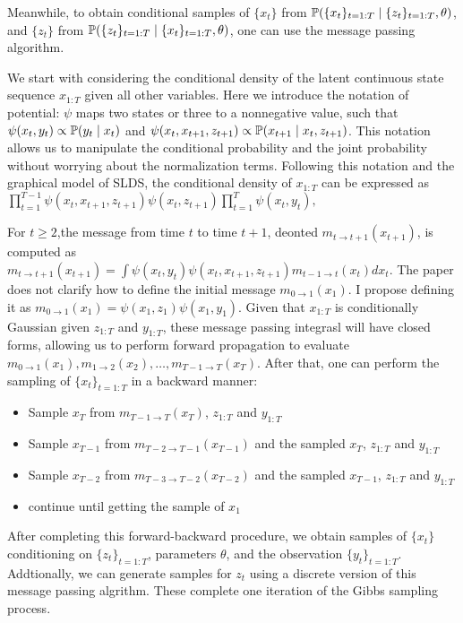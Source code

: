 Meanwhile, to obtain conditional samples of $\{x_t\}$ from $\mathbb{P}(\{x_{t}\}_{t=1:T} \mid \{z_t\}_{t=1:T}, \theta)$, and $\{z_t\}$ from $\mathbb{P}(\{z_{t}\}_{t=1:T} \mid \{x_t\}_{t=1:T}, \theta)$, one can use the message passing algorithm.

We start with considering the  conditional  density  of  the  latent continuous  state  sequence $x_{1:T}$ given  all  other  variables. Here we introduce the notation of potential: $\psi$ maps two states or three to a nonnegative value, such that $\psi(x_t,y_t)\propto \mathbb{P}(y_t \mid x_t)$ and $\psi(x_t,x_{t+1},z_{t+1})\propto \mathbb{P}(x_{t+1} \mid x_t,z_{t+1})$. This notation allows us to manipulate the conditional probability and the joint probability without worrying about the normalization terms. Following this notation and the graphical model of SLDS, the conditional density of $x_{1:T}$ can be expressed as $
\prod_{t=1}^{T-1} \psi\left(x_{t}, x_{t+1}, z_{t+1}\right) \psi\left(x_{t}, z_{t+1}\right) \prod_{t=1}^{T} \psi\left(x_{t}, y_{t}\right),
$

 
For $t\geq 2$,the message from time $t$ to time $t+1$, deonted $m_{t \rightarrow t+1}(x_{t+1})$, is computed as 
$ m_{t \rightarrow t+1}(x_{t+1})=\int \psi(x_t,y_t) \psi(x_t,x_{t+1},z_{t+1}) m_{t-1 \rightarrow t}(x_t) dx_t $. The paper does not clarify how to define the initial message $m_{0 \rightarrow 1}(x_1)$. I propose defining it as $m_{0 \rightarrow 1}(x_1)=\psi\left(x_{1}, z_{1}\right) \psi\left(x_{1}, y_{1}\right)$. Given that $x_{1:T}$ is  conditionally Gaussian given $z_{1:T}$ and $y_{1:T}$, these message passing integrasl will have closed forms, allowing us to perform forward propagation to evaluate $m_{0 \rightarrow 1}(x_1), m_{1 \rightarrow 2}(x_2),\dots, m_{T-1 \rightarrow T}(x_T)$. After that, one can perform the sampling of $\{x_t\}_{t=1:T}$ in a backward manner: 
\begin{itemize}
  \item Sample $x_T$ from $m_{T-1 \rightarrow T}(x_T)$, $z_{1:T}$ and $y_{1:T}$
  \item Sample $x_{T-1}$ from $m_{T-2 \rightarrow T-1}(x_{T-1})$ and the sampled $x_T$, $z_{1:T}$ and $y_{1:T}$
  \item Sample $x_{T-2}$ from $m_{T-3 \rightarrow T-2}(x_{T-2})$ and the sampled $x_{T-1}$, $z_{1:T}$ and $y_{1:T}$
  \item continue until getting the sample of $x_1$
\end{itemize}
After completing this forward-backward procedure, we obtain samples of $\{x_t\}$ conditioning on $\{z_t\}_{t=1:T}$, parameters $\theta$, and the observation $\{y_t\}_{t=1:T}$. Addtionally, we can generate samples for $z_t$ using a discrete version of this message passing algrithm. These complete one iteration of the Gibbs sampling process.



